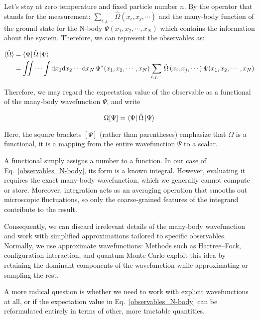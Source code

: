 Let's stay at zero temperature and fixed particle number $n$. By the operator that stands for the measurement: $\sum_{i,j,\cdots}\hat\Omega\left(x_i,x_j,\cdots\right)$ and the many-body function of the ground state for the N-body $\Psi(x_1,x_2,\cdots,x_N)$ which contains the information about the system. Therefore, we can represent the observables as:

\begin{equation}
\begin{aligned}
    \braket{\hat\Omega} 
    &= \bra{\Psi}\hat\Omega\ket{\Psi} \\
    &= \iint\cdots\int \mathrm{d}x_1\mathrm{d}x_2\cdots\mathrm{d}x_N\,\Psi^*(x_1,x_2,\cdots,x_N)\sum_{i,j,\cdots}\hat\Omega\left(x_i,x_j,\cdots\right)\Psi(x_1,x_2,\cdots,x_N)
\end{aligned}
\label{observables_N-body}
\end{equation}

Therefore, we may regard the expectation value of the observable as a functional of the many‐body wavefunction $\Psi$, and write

\begin{equation}
\Omega[\Psi] = \bra{\Psi}\hat{\Omega}\ket{\Psi}
\label{observables_functional}
\end{equation}

Here, the square brackets $[\Psi]$ (rather than parentheses) emphasize that $\Omega$ is a functional, it is a mapping from the entire wavefunction $\Psi$ to a scalar.

A functional simply assigns a number to a function. In our case of Eq.~\eqref{observables_N-body}, its form is a known integral. However, evaluating it requires the exact many-body wavefunction, which we generally cannot compute or store. Moreover, integration acts as an averaging operation that smooths out microscopic fluctuations, so only the coarse‐grained features of the integrand contribute to the result.

Consequently, we can discard irrelevant details of the many‐body wavefunction and work with simplified approximations tailored to specific observables. Normally, we use approximate wavefunctions: Methods such as Hartree–Fock, configuration interaction, and quantum Monte Carlo exploit this idea by retaining the dominant components of the wavefunction while approximating or sampling the rest.

A more radical question is whether we need to work with explicit wavefunctions at all, or if the expectation value in Eq.~\eqref{observables_N-body} can be reformulated entirely in terms of other, more tractable quantities.


